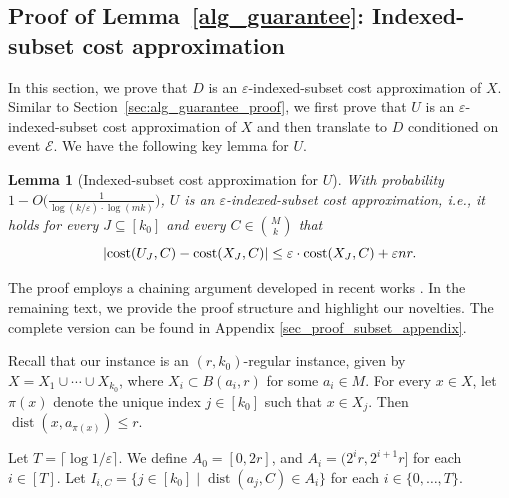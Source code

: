 \documentclass[11pt,letterpaper]{article}
\newtheorem{lemma}[theorem]{Lemma}
\theoremstyle{definition}
\newcommand{\eps}{\varepsilon}
\DeclareMathOperator{\dist}{dist}
\DeclarePairedDelimiter{\abs}{\lvert}{\rvert}
\begin{document}
\subsection{Proof of Lemma~\ref{alg_guarantee}: Indexed-subset cost approximation}
\label{sec_proof_subset}

In this section, we prove that $D$ is an $\eps$-indexed-subset cost approximation of $X$.
%
Similar to Section~\ref{sec:alg_guarantee_proof}, we first prove that $U$ is an $\eps$-indexed-subset cost approximation of $X$ and then translate to $D$ conditioned on event $\mathcal{E}$.
%
We have the following key lemma for $U$.

\begin{lemma}[Indexed-subset cost approximation for $U$] \label{lemma_subset}  
With probability $1-O\big(\frac{1}{\log(k/\eps)\cdot \log (mk)}\big)$, $U$ is an $\eps$-indexed-subset cost approximation, i.e., it holds for every $J\subseteq [k_0]$ and every $C\in \binom{M}{k}$ that
\begin{equation} \label{inq_subset}
    \abs{ \cost(U_J,C)-\cost(X_J,C) } \leq \eps\cdot \cost(X_J,C)+\eps n r.
\end{equation}
\end{lemma}

The proof employs a chaining argument developed in recent works \cite{fefferman2016testing,Cohen2022Towards,Cohen25}.  
%
In the remaining text, we provide the proof structure and highlight our novelties.
%
The complete version can be found in Appendix \ref{sec_proof_subset_appendix}.
%

Recall that our instance is an $(r,k_0)$-regular instance, given by $X=X_1\cup\cdots\cup X_{k_0}$, where $X_i\subset B(a_i,r)$ for some $a_i\in M$. For every $x\in X$, let $\pi(x)$ denote the unique index $j\in [k_0]$ such that $x\in X_j$. Then $\dist(x,a_{\pi(x)})\leq r$.

Let $T=\lceil \log 1/\eps\rceil$. We define $A_0=[0,2r]$, and $A_i=(2^i r,2^{i+1}r]$ for each $i\in [T]$. Let $I_{i,C}=\{j\in [k_0]\mid \dist(a_j,C)\in A_i\}$ for each $i\in \{0,\dots,T\}$.
\end{document}
